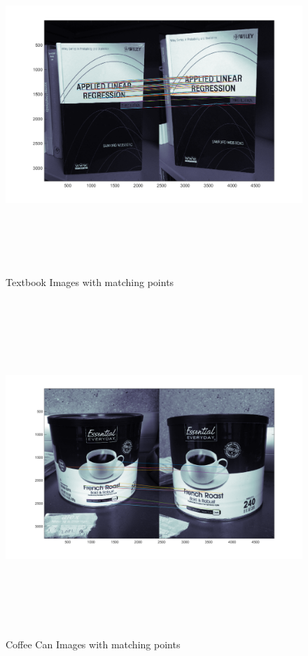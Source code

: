 \documentclass[11pt,psfig]{article}
\begin{document}
\begin{figure}[H]
\centering
\includegraphics[height=5in]{book_prob2Matches.png}
\caption{Textbook Images with matching points}
\label{p2e}
\end{figure}

\begin{figure}[H]
\centering
\includegraphics[height=5in]{coffeeCan_prob2Matches.png}
\caption{Coffee Can Images with matching points}
\label{p2f}
\end{figure}
\end{document}
